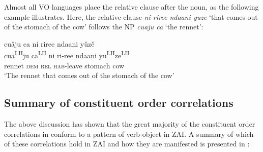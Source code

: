 Almost all VO languages place the relative clause after the noun, as the following example illustrates. Here, the relative clause \textit{ni riree ndaani yuze} `that comes out of the stomach of the cow' follows the NP \textit{cuaju ca} `the rennet':

\ea
\glll cu\v{a}ju ca n\'{i} riree ndaani y\v{u}z\v{e} \\
cua\textsuperscript{LH}ju ca\textsuperscript{LH} ni ri-ree ndaani yu\textsuperscript{LH}ze\textsuperscript{LH} \\
rennet \textsc{dem} \textsc{rel} \textsc{hab}-leave stomach cow \\
\glt `The rennet that comes out of the stomach of the cow'
\z



\subsection{Summary of constituent order correlations}

The above discussion has shown that the great majority of the constituent order correlations in  conform to a pattern of verb-object in ZAI. A summary of which of these correlations hold in ZAI and how they are manifested is presented in :

